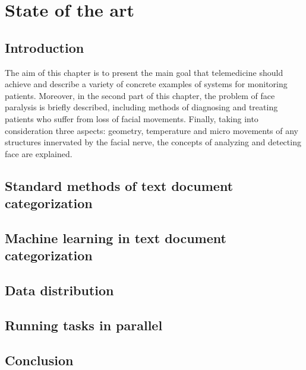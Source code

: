 \chapter{State of the art}
\label{state_of_art}

\section{Introduction}
The aim of this chapter is to present the main goal that telemedicine should achieve and describe a variety of concrete examples of systems for monitoring patients. Moreover, in the second part of this chapter, the problem of face paralysis is briefly described, including methods of diagnosing and treating patients who suffer from loss of facial movements. Finally, taking into consideration three aspects: geometry, temperature and micro movements of any structures innervated by the facial nerve, the concepts of analyzing and detecting face are explained.

\section{Standard methods of text document categorization}
\section{Machine learning in text document categorization}
\section{Data distribution}
\section{Running tasks in parallel}

\section{Conclusion}